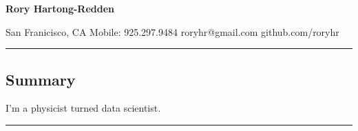 \documentclass[10pt,letterpaper]{article}
\begin{document}
{\raggedright 
\LARGE{\bf Rory Hartong-Redden}\\}

{\raggedleft 
San Franicisco, CA \textbar\/ Mobile: 925.297.9484 \textbar\/ roryhr@gmail.com \textbar\/   github.com/roryhr\\}
\hrule


\vspace{-0.4em}
\subsection*{Summary}

\begin{centering}  
I'm a physicist turned data scientist.\\
\end{centering}

\vspace{0.4em}
	

\hrule
\vspace{-0.4em}
\end{document}
